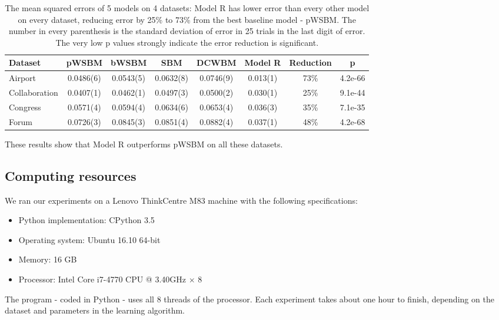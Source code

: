 \documentclass[letterpaper]{article}
\begin{document}
\begin{table}[!htb]\centering
	\caption{
		The mean squared errors of 5 models on 4 datasets:
		Model R has lower error than every other model on every dataset,
		reducing error by 25\% to 73\% from the best baseline model - pWSBM.
		The number in every parenthesis is the standard deviation of error in 25 trials in the last digit of error. The very low p values strongly indicate the error reduction is significant.
	}
	\begin{tabularx}{\textwidth}{|X|c|c|c|c|c|c|c|} \hline \rowcolor{blue!50}
		Dataset & pWSBM & bWSBM & SBM & DCWBM & Model R & Reduction & p \\ \hline
		Airport & 0.0486(6) & 0.0543(5) & 0.0632(8) & 0.0746(9) & 0.013(1) & 73\% & 4.2e-66 \\ \hline
		Collaboration & 0.0407(1) & 0.0462(1) & 0.0497(3) & 0.0500(2) & 0.030(1) & 25\% & 9.1e-44 \\ \hline
		Congress & 0.0571(4) & 0.0594(4) & 0.0634(6) & 0.0653(4) & 0.036(3) & 35\% & 7.1e-35 \\ \hline
		Forum & 0.0726(3) & 0.0845(3) & 0.0851(4) & 0.0882(4) & 0.037(1) & 48\% & 4.2e-68 \\ \hline
	\end{tabularx}
	\label{tab:errors}
\end{table}
These results show that Model R outperforms pWSBM on all these datasets.

\subsection{Computing resources}
We ran our experiments on a Lenovo ThinkCentre M83 machine with the following specifications:
\begin{itemize}
	\item Python implementation: CPython 3.5
	\item Operating system: Ubuntu 16.10 64-bit
	\item Memory: 16 GB
	\item Processor: Intel Core i7-4770 CPU @ 3.40GHz $ \times $ 8
\end{itemize}
The program - coded in Python - uses all 8 threads of the processor.
Each experiment takes about one hour to finish,
depending on the dataset and parameters in the learning algorithm.



\end{document}
